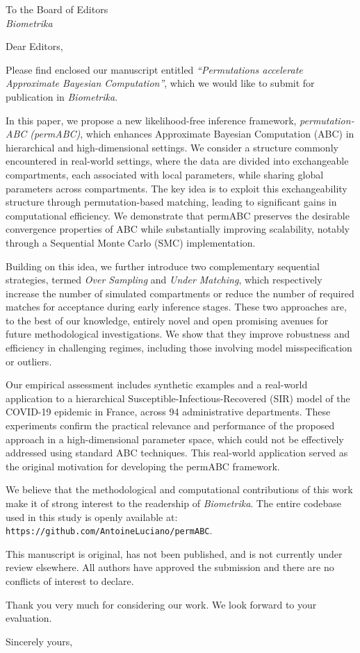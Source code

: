 \documentclass[10.5pt]{letter}
\date{\today}
\begin{document}
\begin{letter}{To the Board of Editors\\\emph{Biometrika}}

\opening{Dear Editors,}

Please find enclosed our manuscript entitled \emph{``Permutations accelerate Approximate Bayesian Computation''}, which we would like to submit for publication in \emph{Biometrika}.

In this paper, we propose a new likelihood-free inference framework, \emph{permutation-ABC (permABC)}, which enhances Approximate Bayesian Computation (ABC) in hierarchical and high-dimensional settings. We consider a structure commonly encountered in real-world settings, where the data are divided into exchangeable compartments, each associated with local parameters, while sharing global parameters across compartments. The key idea is to exploit this exchangeability structure through permutation-based matching, leading to significant gains in computational efficiency. We demonstrate that permABC preserves the desirable convergence properties of ABC while substantially improving scalability, notably through a Sequential Monte Carlo (SMC) implementation.





Building on this idea, we further introduce two complementary sequential strategies, termed \emph{Over Sampling} and \emph{Under Matching}, which respectively increase the number of simulated compartments or reduce the number of required matches for acceptance during early inference stages. These two approaches are, to the best of our knowledge, entirely novel and open promising avenues for future methodological investigations. We show that they improve robustness and efficiency in challenging regimes, including those involving model misspecification or outliers.

Our empirical assessment includes synthetic examples and a real-world application to a hierarchical Susceptible-Infectious-Recovered (SIR) model of the COVID-19 epidemic in France, across 94 administrative departments. These experiments confirm the practical relevance and performance of the proposed approach in a high-dimensional parameter space, which could not be effectively addressed using standard ABC techniques. This real-world application served as the original motivation for developing the permABC framework.


We believe that the methodological and computational contributions of this work make it of strong interest to the readership of \emph{Biometrika}. The entire codebase used in this study is openly available at: \texttt{https://github.com/AntoineLuciano/permABC}.

This manuscript is original, has not been published, and is not currently under review elsewhere. All authors have approved the submission and there are no conflicts of interest to declare.

Thank you very much for considering our work. We look forward to your evaluation.

\closing{Sincerely yours,}

\end{letter}
\end{document}
